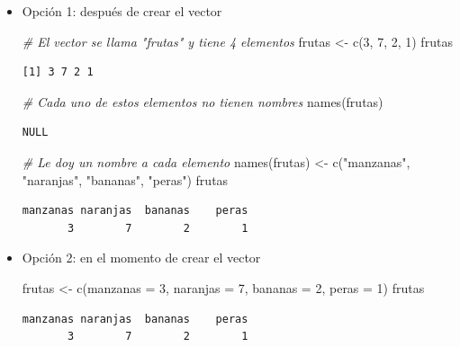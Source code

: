 \documentclass[
]{book}
\newenvironment{Shaded}{\begin{snugshade}}{\end{snugshade}}
\newcommand{\AttributeTok}[1]{\textcolor[rgb]{0.77,0.63,0.00}{#1}}
\newcommand{\CommentTok}[1]{\textcolor[rgb]{0.56,0.35,0.01}{\textit{#1}}}
\newcommand{\DecValTok}[1]{\textcolor[rgb]{0.00,0.00,0.81}{#1}}
\newcommand{\FunctionTok}[1]{\textcolor[rgb]{0.00,0.00,0.00}{#1}}
\newcommand{\NormalTok}[1]{#1}
\newcommand{\OtherTok}[1]{\textcolor[rgb]{0.56,0.35,0.01}{#1}}
\newcommand{\StringTok}[1]{\textcolor[rgb]{0.31,0.60,0.02}{#1}}
\begin{document}
\begin{itemize}
\item
  Opción 1: después de crear el vector

\begin{Shaded}
\begin{Highlighting}[]
\CommentTok{\# El vector se llama "frutas" y tiene 4 elementos}
\NormalTok{frutas }\OtherTok{\textless{}{-}} \FunctionTok{c}\NormalTok{(}\DecValTok{3}\NormalTok{, }\DecValTok{7}\NormalTok{, }\DecValTok{2}\NormalTok{, }\DecValTok{1}\NormalTok{)}
\NormalTok{frutas}
\end{Highlighting}
\end{Shaded}

\begin{verbatim}
[1] 3 7 2 1
\end{verbatim}

\begin{Shaded}
\begin{Highlighting}[]
\CommentTok{\# Cada uno de estos elementos no tienen nombres}
\FunctionTok{names}\NormalTok{(frutas)}
\end{Highlighting}
\end{Shaded}

\begin{verbatim}
NULL
\end{verbatim}

\begin{Shaded}
\begin{Highlighting}[]
\CommentTok{\# Le doy un nombre a cada elemento}
\FunctionTok{names}\NormalTok{(frutas) }\OtherTok{\textless{}{-}} \FunctionTok{c}\NormalTok{(}\StringTok{"manzanas"}\NormalTok{, }\StringTok{"naranjas"}\NormalTok{, }\StringTok{"bananas"}\NormalTok{, }\StringTok{"peras"}\NormalTok{)}
\NormalTok{frutas}
\end{Highlighting}
\end{Shaded}

\begin{verbatim}
manzanas naranjas  bananas    peras 
       3        7        2        1 
\end{verbatim}
\item
  Opción 2: en el momento de crear el vector

\begin{Shaded}
\begin{Highlighting}[]
\NormalTok{frutas }\OtherTok{\textless{}{-}} \FunctionTok{c}\NormalTok{(}\AttributeTok{manzanas =} \DecValTok{3}\NormalTok{, }\AttributeTok{naranjas =} \DecValTok{7}\NormalTok{, }\AttributeTok{bananas =} \DecValTok{2}\NormalTok{, }\AttributeTok{peras =} \DecValTok{1}\NormalTok{)}
\NormalTok{frutas}
\end{Highlighting}
\end{Shaded}

\begin{verbatim}
manzanas naranjas  bananas    peras 
       3        7        2        1 
\end{verbatim}
\end{itemize}
\end{document}
